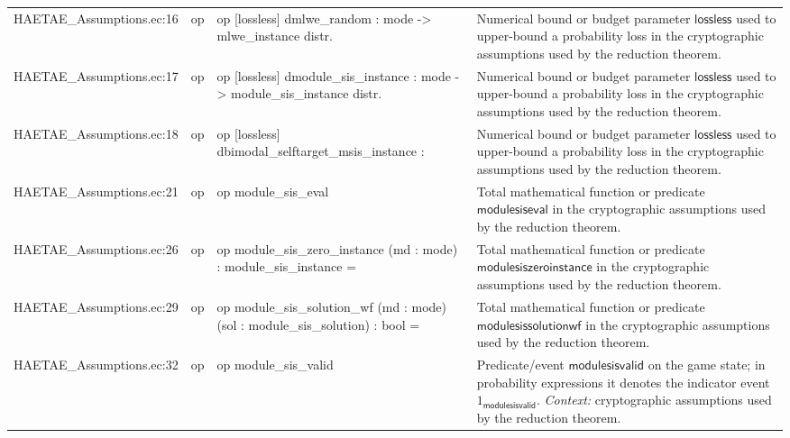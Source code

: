 \documentclass[10pt]{article}
\begin{document}
\begin{longtable}{L{0.11\textwidth}L{0.055\textwidth}L{0.385\textwidth}L{0.41\textwidth}}
HAETAE\_\allowbreak{}Assumptions.\allowbreak{}ec:\allowbreak{}16 & op & {\ttfamily\scriptsize op [lossless] dmlwe\_\allowbreak{}random : mode -\textgreater{} mlwe\_\allowbreak{}instance distr.} & Numerical bound or budget parameter $\mathsf{lossless}$ used to upper-bound a probability loss in the cryptographic assumptions used by the reduction theorem. \\
HAETAE\_\allowbreak{}Assumptions.\allowbreak{}ec:\allowbreak{}17 & op & {\ttfamily\scriptsize op [lossless] dmodule\_\allowbreak{}sis\_\allowbreak{}instance : mode -\textgreater{} module\_\allowbreak{}sis\_\allowbreak{}instance distr.} & Numerical bound or budget parameter $\mathsf{lossless}$ used to upper-bound a probability loss in the cryptographic assumptions used by the reduction theorem. \\
HAETAE\_\allowbreak{}Assumptions.\allowbreak{}ec:\allowbreak{}18 & op & {\ttfamily\scriptsize op [lossless] dbimodal\_\allowbreak{}selftarget\_\allowbreak{}msis\_\allowbreak{}instance :} & Numerical bound or budget parameter $\mathsf{lossless}$ used to upper-bound a probability loss in the cryptographic assumptions used by the reduction theorem. \\
HAETAE\_\allowbreak{}Assumptions.\allowbreak{}ec:\allowbreak{}21 & op & {\ttfamily\scriptsize op module\_\allowbreak{}sis\_\allowbreak{}eval} & Total mathematical function or predicate $\mathsf{modulesiseval}$ in the cryptographic assumptions used by the reduction theorem. \\
HAETAE\_\allowbreak{}Assumptions.\allowbreak{}ec:\allowbreak{}26 & op & {\ttfamily\scriptsize op module\_\allowbreak{}sis\_\allowbreak{}zero\_\allowbreak{}instance (md : mode) : module\_\allowbreak{}sis\_\allowbreak{}instance =} & Total mathematical function or predicate $\mathsf{modulesiszeroinstance}$ in the cryptographic assumptions used by the reduction theorem. \\
HAETAE\_\allowbreak{}Assumptions.\allowbreak{}ec:\allowbreak{}29 & op & {\ttfamily\scriptsize op module\_\allowbreak{}sis\_\allowbreak{}solution\_\allowbreak{}wf (md : mode) (sol : module\_\allowbreak{}sis\_\allowbreak{}solution) : bool =} & Total mathematical function or predicate $\mathsf{modulesissolutionwf}$ in the cryptographic assumptions used by the reduction theorem. \\
HAETAE\_\allowbreak{}Assumptions.\allowbreak{}ec:\allowbreak{}32 & op & {\ttfamily\scriptsize op module\_\allowbreak{}sis\_\allowbreak{}valid} & Predicate/event $\mathsf{modulesisvalid}$ on the game state; in probability expressions it denotes the indicator event $1_{\mathsf{modulesisvalid}}$. \emph{Context:} cryptographic assumptions used by the reduction theorem. \\

\end{longtable}
\end{document}
